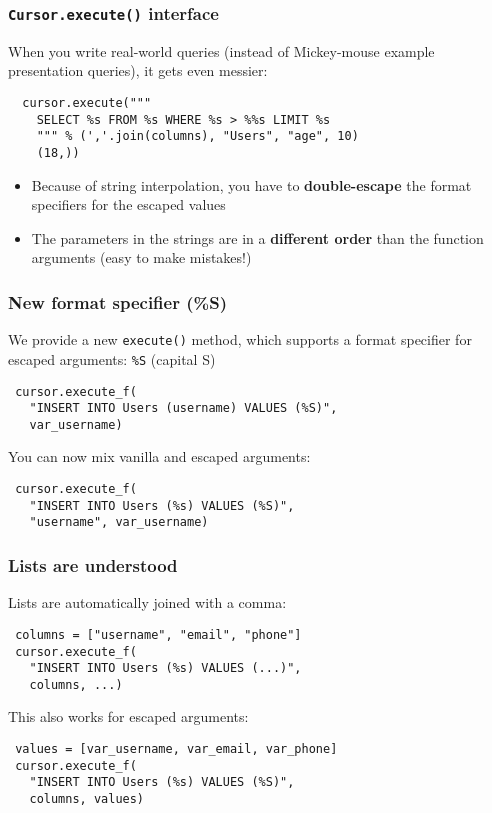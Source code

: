 \documentclass{beamer}
\begin{document}
\begin{frame}[fragile]
  \frametitle{\texttt{Cursor.execute()} interface}

  When you write real-world queries (instead of Mickey-mouse example
  presentation queries), it gets even messier:
\begin{verbatim}
  cursor.execute("""
    SELECT %s FROM %s WHERE %s > %%s LIMIT %s
    """ % (','.join(columns), "Users", "age", 10)
    (18,))
\end{verbatim}

\begin{itemize}
\item Because of string interpolation, you have to \textbf{double-escape} the
  format specifiers for the escaped values
\item The parameters in the strings are in a \textbf{different order} than the
  function arguments (easy to make mistakes!)
\end{itemize}

\end{frame}




\begin{frame}[fragile]
  \frametitle{New format specifier (\%S)}

  We provide a new \texttt{execute()} method, which supports a format specifier
  for escaped arguments: \texttt{\%S} (capital S)

\begin{verbatim}
 cursor.execute_f(
   "INSERT INTO Users (username) VALUES (%S)",
   var_username)
\end{verbatim}

  You can now mix vanilla and escaped arguments:
\begin{verbatim}
 cursor.execute_f(
   "INSERT INTO Users (%s) VALUES (%S)",
   "username", var_username)
\end{verbatim}

\end{frame}



\begin{frame}[fragile]
  \frametitle{Lists are understood}

  Lists are automatically joined with a comma:
\begin{verbatim}
 columns = ["username", "email", "phone"]
 cursor.execute_f(
   "INSERT INTO Users (%s) VALUES (...)",
   columns, ...)
\end{verbatim}

\pause
  This also works for escaped arguments:
\begin{verbatim}
 values = [var_username, var_email, var_phone]
 cursor.execute_f(
   "INSERT INTO Users (%s) VALUES (%S)",
   columns, values)
\end{verbatim}

\end{frame}
\end{document}
